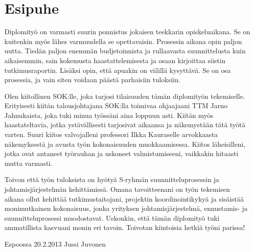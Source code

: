 \documentclass[12pt,a4paper,oneside,pdftex]{report}
\newcommand{\FDATE}{20.2.2013}
\newcommand{\AUTHOR}{Jussi Juvonen}
\begin{document}
\chapter*{Esipuhe}

Diplomityö on varmasti suurin ponnistus jokaisen teekkarin opiskeluaikana. Se on kuitenkin myös lähes varmuudella se opettavaisin. Prosessin aikana opin paljon uutta. Tiedän paljon enemmän budjetoinnista ja rullaavasta suunnittelusta kuin aikaisemmin, sain kokemusta haastattelemisesta ja osaan kirjoittaa siistin tutkimusraportin. Lisäksi opin, että apuakin on välillä kysyttävä. Se on osa prosessia, ja vain siten voidaan päästä parhaisiin tuloksiin.

Olen kiitollinen SOK:lle, joka tarjosi tilaisuuden tämän diplomityön tekemiselle. Erityisesti kiitän talousjohtajana SOK:lla toimivaa ohjaajaani TTM Jarno Jahnukaista, joka tuki minua työssäni aina loppuun asti. Kiitän myös haastateltavia, jotka ystävällisesti tarjosivat aikaansa ja näkemystään tätä työtä varten. Suuri kiitos valvojalleni professori Ilkka Kauraselle arvokkaasta näkemyksestä ja avusta työn kokonaisuuden muokkaamisessa. Kiitos läheisilleni, jotka ovat antaneet työrauhan ja uskoneet valmistumiseeni, vaikkakin hitaasti mutta varmasti.

Toivon että työn tuloksista on hyötyä S-ryhmän suunnitteluprosessin ja johtamisjärjestelmän kehittämissä. Omana tavoitteenani on työn tekemisen aikana ollut kehittää tutkimustaitojani, projektin koordinointikykyä ja sisäistää monimutkainen kokonaisuus, jonka yrityksen johtamisjärjestelmä, ennustamis- ja suunnitteluprosessi muodostavat. Uskonkin, että tämän diplomityö tuki ammatillista kasvuani monin eri tavoin. Toivotan kiintoisia hetkiä työni parissa!

\vskip 10mm

\noindent Espoossa \FDATE
\vskip 5mm
\noindent\AUTHOR

\cleardoublepage
% 

\cleardoublepage
\tableofcontents
\end{document}
